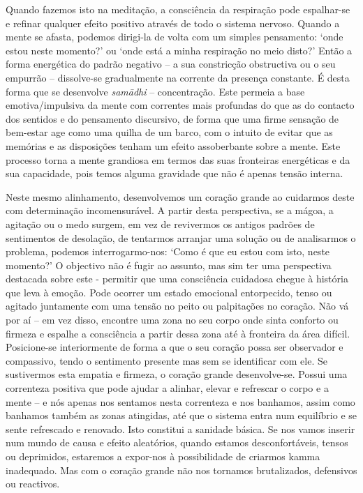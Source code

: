 Quando fazemos isto na meditação, a consciência da respiração pode espalhar-se e refinar qualquer efeito positivo através de todo o sistema nervoso. Quando a mente se afasta, podemos dirigi-la de volta com um simples pensamento: `onde estou neste momento?' ou `onde está a minha respiração no meio disto?' Então a forma energética do padrão negativo -- a sua constricção obstructiva ou o seu empurrão -- dissolve-se gradualmente na corrente da presença constante. É desta forma que se desenvolve \emph{samādhi} -- concentração. Este permeia a base emotiva/impulsiva da mente com correntes mais profundas do que as do contacto dos sentidos e do pensamento discursivo, de forma que uma firme sensação de bem-estar age como uma quilha de um barco, com o intuito de evitar que as memórias e as disposições tenham um efeito assoberbante sobre a mente. Este processo torna a mente grandiosa em termos das suas fronteiras energéticas e da sua capacidade, pois temos alguma gravidade que não é apenas tensão interna.

Neste mesmo alinhamento, desenvolvemos um coração grande ao cuidarmos deste com determinação incomensurável. A partir desta perspectiva, se a mágoa, a agitação ou o medo surgem, em vez de revivermos os antigos padrões de sentimentos de desolação, de tentarmos arranjar uma solução ou de analisarmos o problema, podemos interrogarmo-nos: `Como é que eu estou com isto, neste momento?' O objectivo não é fugir ao assunto, mas sim ter uma perspectiva destacada sobre este - permitir que uma consciência cuidadosa chegue à história que leva à emoção. Pode ocorrer um estado emocional entorpecido, tenso ou agitado juntamente com uma tensão no peito ou palpitações no coração. Não vá por aí -- em vez disso, encontre uma zona no seu corpo onde sinta conforto ou firmeza e espalhe a consciência a partir dessa zona até à fronteira da área difícil. Posicione-se interiormente de forma a que o seu coração possa ser observador e compassivo, tendo o sentimento presente mas sem se identificar com ele. Se sustivermos esta empatia e firmeza, o coração grande desenvolve-se. Possui uma correnteza positiva que pode ajudar a alinhar, elevar e refrescar o corpo e a mente -- e nós apenas nos sentamos nesta correnteza e nos banhamos, assim como banhamos também as zonas atingidas, até que o sistema entra num equilíbrio e se sente refrescado e renovado. Isto constitui a sanidade básica. Se nos vamos inserir num mundo de causa e efeito aleatórios, quando estamos desconfortáveis, tensos ou deprimidos, estaremos a expor-nos à possibilidade de criarmos kamma inadequado. Mas com o coração grande não nos tornamos brutalizados, defensivos ou reactivos.

